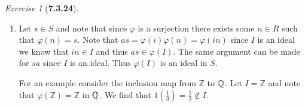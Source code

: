\documentclass[12pt]{amsart}
\makeatletter
\theoremstyle{remark}
\newtheorem*{exercise}{Exercise}%
\def\ZZ{\ensuremath{\mathbb Z}}
\def\QQ{{\ensuremath\mathbb Q}}
\renewenvironment{proof}[1][\proofname]{\par\doublespacing
  \pushQED{\qed}%
  \normalfont \topsep6\p@\@plus6\p@\relax
  \list{}{%
    \settowidth{\leftmargin}{\itshape\proofname:\hskip\labelsep}%
    \setlength{\labelwidth}{0pt}%
    \setlength{\itemindent}{-\leftmargin}%
  }%
  \item[\hskip\labelsep\itshape#1\@addpunct{:}]\ignorespaces
}{%
  \popQED\endlist\@endpefalse
  \singlespacing
}
\theoremstyle{mycomment}
\makeatother
\begin{document}
\begin{exercise}[\textbf{7.3.24}]
\begin{enumerate}
\begin{proof}
      Let $s \in S$ and note that since $\varphi$ is a surjection there exists some $n \in R$ such that $\varphi(n) = s$. Note that $as = \varphi(i)\varphi(n) = \varphi(in)$ since $I$ is an ideal we know that $in \in I$ and thus 
      $as \in \varphi(I)$. The same argument can be made for $sa$ since $I$ is an ideal. Thus $\varphi(I)$ is an ideal in $S$.

      For an example consider the inclusion map from $\ZZ$ to $\QQ$. Let $I = \ZZ$ and note that $\varphi(\ZZ) = \ZZ$ in $\QQ$. We find that $1(\frac{1}{3}) = \frac{1}{3} \not\in I$. 
    \end{proof}
  \end{enumerate}
\end{exercise}
\vspace{.5in}
\end{document}
